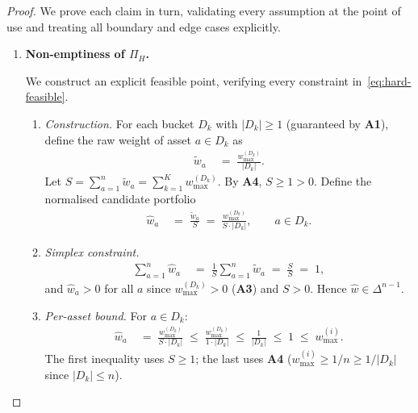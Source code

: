 \documentclass[12pt,openany]{book}
\newcommand{\bfw}{\mathbf{w}}
\newcommand{\calD}{\mathcal{D}}
\numberwithin{equation}{chapter}
\theoremstyle{plain}
\theoremstyle{definition}
\theoremstyle{remark}
\def\calD{D}%
\def\mathcal#1{#1}%
\def\bfw{w}%
\begin{document}
\begin{proof}
We prove each claim in turn, validating every assumption at the point
of use and treating all boundary and edge cases explicitly.

\begin{enumerate}

\item \textbf{Non-emptiness of $\Pi_H$.}

  We construct an explicit feasible point, verifying every constraint
  in~\eqref{eq:hard-feasible}.

  \begin{enumerate}
    \item \textit{Construction.}
          For each bucket $\calD_k$ with $|\calD_k| \geq 1$ (guaranteed
          by \textbf{A1}), define the raw weight of asset
          $a \in \calD_k$ as
          \begin{align}
            \tilde{w}_a
            &\;=\;
            \frac{w_{\max}^{(\calD_k)}}{|\calD_k|}.
            \label{eq:raw-weight}
          \end{align}
          Let $S = \sum_{a=1}^{n} \tilde{w}_a
               = \sum_{k=1}^{K} w_{\max}^{(\calD_k)}$.
          By \textbf{A4}, $S \geq 1 > 0$.
          Define the normalised candidate portfolio
          \begin{align}
            \hat{w}_a
            &\;=\;
            \frac{\tilde{w}_a}{S}
            \;=\;
            \frac{w_{\max}^{(\calD_k)}}{S \cdot |\calD_k|},
            \qquad a \in \calD_k.
            \label{eq:normalised-weight}
          \end{align}

    \item \textit{Simplex constraint.}
          \begin{align}
            \sum_{a=1}^{n} \hat{w}_a
            &\;=\;
            \frac{1}{S}\sum_{a=1}^{n}\tilde{w}_a
            \;=\;
            \frac{S}{S}
            \;=\; 1,
            \label{eq:simplex-check}
          \end{align}
          and $\hat{w}_a > 0$ for all $a$ since
          $w_{\max}^{(\calD_k)} > 0$ (\textbf{A3}) and $S > 0$.
          Hence $\hat{\bfw} \in \Delta^{n-1}$.

    \item \textit{Per-asset bound.}
          For $a \in \calD_k$:
          \begin{align}
            \hat{w}_a
            &\;=\;
            \frac{w_{\max}^{(\calD_k)}}{S \cdot |\calD_k|}
            \;\leq\;
            \frac{w_{\max}^{(\calD_k)}}{1 \cdot |\calD_k|}
            \;\leq\;
            \frac{1}{|\calD_k|}
            \;\leq\; 1
            \;\leq\; w_{\max}^{(i)}.
            \label{eq:per-asset-check}
          \end{align}
          The first inequality uses $S \geq 1$; the last uses
          \textbf{A4} ($w_{\max}^{(i)} \geq 1/n \geq 1/|\calD_k|$
          since $|\calD_k| \leq n$).


\end{enumerate}
\end{enumerate}
\end{proof}
\end{document}
